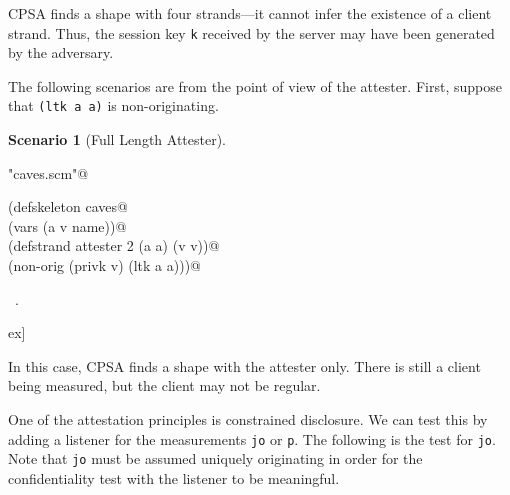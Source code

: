 \documentclass[titlepage,12pt]{article}
\theoremstyle{definition}
\newtheorem{scenario}{Scenario}
\begin{document}
CPSA finds a shape with four strands---it cannot infer the existence
of a client strand. Thus, the session key \texttt{k} received
by the server may have been generated by the adversary.

The following scenarios are from the point of view of the
attester. First, suppose that \texttt{(ltk a a)} is
non-originating.

\begin{scenario}[Full Length Attester]
\begin{flushleft} \small
\begin{minipage}{\linewidth} \label{scrap26}
\verb@"caves.scm"@\nobreak\ {\footnotesize {} }
\vspace{-1ex}
\begin{list}{}{} \item
\mbox{}\verb@(defskeleton caves@\\
\mbox{}\verb@  (vars (a v name))@\\
\mbox{}\verb@  (defstrand attester 2 (a a) (v v))@\\
\mbox{}\verb@  (non-orig (privk v) (ltk a a)))@{\NWsep}
\end{list}
\vspace{-1ex}
\footnotesize\addtolength{\baselineskip}{-1ex}
\begin{list}{}{\setlength{\itemsep}{-\parsep}\setlength{\itemindent}{-\leftmargin}}
\item \NWtxtFileDefBy\ .
\end{list}
\end{minipage}\4ex]
\end{flushleft}
\end{scenario}

In this case, CPSA finds a shape with the attester only.
There is still a client being measured, but the client
may not be regular.

One of the attestation principles is constrained disclosure.
We can test this by adding a listener for the measurements
\texttt{jo} or \texttt{p}. The following is
the test for \texttt{jo}. Note that \texttt{jo} must be
assumed uniquely originating in order for the confidentiality
test with the listener to be meaningful.
\end{document}

